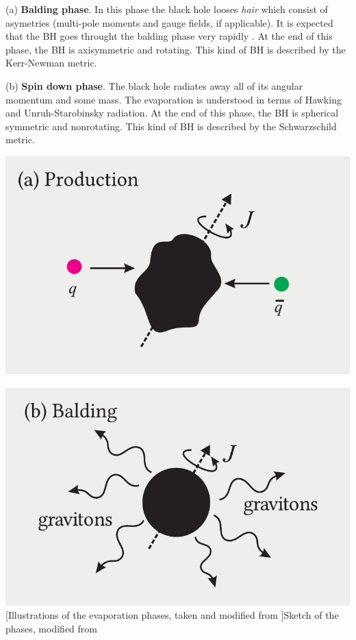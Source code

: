 \documentclass[12pt,a4paper]{report}
\numberwithin{equation}{chapter}
\begin{document}
%
\begin{enumerate}
%
\begin{minipage}{0.55\linewidth}
\item[(a)] {\bf Balding phase}. In this phase the black hole looses \emph{hair} which consist of asymetries (multi-pole moments and gauge fields, if applicable). It is expected that the BH goes throught the balding phase very rapidly \cite{Winstanley2007}. At the end of this phase, the BH is axisymmetric and rotating. This kind of BH is described by the Kerr-Newman metric.

\item[(b)] {\bf Spin down phase}. The black hole radiates away all of its angular momentum and some mass. The evaporation is understood in terms of Hawking and Unruh-Starobinsky radiation. At the end of this phase, the BH is spherical symmetric and nonrotating. This kind of BH is described by the Schwarzschild metric.

\end{minipage}
\hfill{}
\begin{minipage}{0.4\linewidth}
\includegraphics[width=\textwidth]{figures/bhphase-ab.pdf}
[Illustrations of the evaporation phases, taken and modified from \cite{Hossenfelder2004}]{Sketch of the phases, modified from \cite{Hossenfelder2004}}\label{fig:evaphases1}
\end{minipage}
\end{enumerate}
\end{document}
